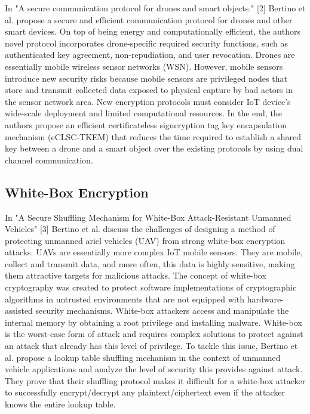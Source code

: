 \documentclass[journal,onecolumn]{IEEEtran}
\begin{document}
In "A secure communication protocol for drones and smart objects." [2] Bertino et al. propose a secure and efficient communication protocol for drones and other smart devices. On top of being energy and computationally efficient, the authors novel protocol incorporates drone-specific required security functions, such as authenticated key agreement, non-repudiation, and user revocation. Drones are essentially mobile wireless sensor networks (WSN). However, mobile sensors introduce new security risks because mobile sensors are privileged nodes that store and transmit collected data exposed to physical capture by bad actors in the sensor network area. New encryption protocols must consider IoT device's wide-scale deployment and limited computational resources. In the end, the authors propose an efficient certificateless signcryption tag key encapsulation mechanism (eCLSC-TKEM) that reduces the time required to establish a shared key between a drone and a smart object over the existing protocols by using dual channel communication. 

\subsection{White-Box Encryption}

In "A Secure Shuffling Mechanism for White-Box Attack-Resistant Unmanned Vehicles" [3] Bertino et al. discuss the challenges of designing a method of protecting unmanned ariel vehicles (UAV) from strong white-box encryption attacks. UAVs are essentially more complex IoT mobile sensors. They are mobile, collect and transmit data, and more often, this data is highly sensitive, making them attractive targets for malicious attacks. The concept of white-box cryptography was created to protect software implementations of cryptographic algorithms in untrusted environments that are not equipped with hardware-assisted security mechanisms. White-box attackers access and manipulate the internal memory by obtaining a root privilege and installing malware. White-box is the worst-case form of attack and requires complex solutions to protect against an attack that already has this level of privilege. To tackle this issue, Bertino et al. propose a lookup table shuffling mechanism in the context of unmanned vehicle applications and analyze the level of security this provides against attack. They prove that their shuffling protocol makes it difficult for a white-box attacker to successfully encrypt/decrypt any plaintext/ciphertext even if the attacker knows the entire lookup table.
\end{document}
